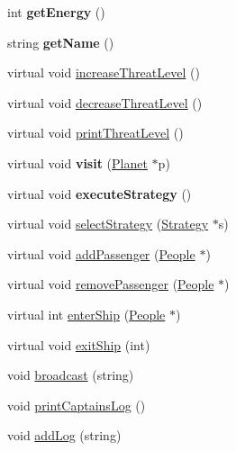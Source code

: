 \begin{DoxyCompactItemize}
\item 
\mbox{\label{classSpaceship_ad28625e31d78cc1edb5e248aaf3f01d8}} 
int {\bfseries get\+Energy} ()
\item 
\mbox{\label{classSpaceship_a89441170fc458252bf8fad377683c23d}} 
string {\bfseries get\+Name} ()
\item 
virtual void \hyperlink{classSpaceship_a5ddf702124286d9d3a6b5e64c09515bc}{increase\+Threat\+Level} ()
\item 
virtual void \hyperlink{classSpaceship_a73a1eefd211e9a2063d924ee85f0c0c7}{decrease\+Threat\+Level} ()
\item 
virtual void \hyperlink{classSpaceship_a8f16814f888a5a1423e5a491329cdb97}{print\+Threat\+Level} ()
\item 
\mbox{\label{classSpaceship_add79868aef85232b23c04af06f288447}} 
virtual void {\bfseries visit} (\hyperlink{classPlanet}{Planet} $\ast$p)
\item 
\mbox{\label{classSpaceship_a10e76fb093ab448894cdeb70994c821d}} 
virtual void {\bfseries execute\+Strategy} ()
\item 
virtual void \hyperlink{classSpaceship_a93be2d9d2b675ef978d866d4cd7a6524}{select\+Strategy} (\hyperlink{classStrategy}{Strategy} $\ast$s)
\item 
virtual void \hyperlink{classSpaceship_a67b7e60d2dc77e740309a9d994d653a1}{add\+Passenger} (\hyperlink{classPeople}{People} $\ast$)
\item 
virtual void \hyperlink{classSpaceship_ac816c2990b25a1b7c9f6acbc9ca132ee}{remove\+Passenger} (\hyperlink{classPeople}{People} $\ast$)
\item 
virtual int \hyperlink{classSpaceship_a3ed78b14953957576e42c6e741e04690}{enter\+Ship} (\hyperlink{classPeople}{People} $\ast$)
\item 
virtual void \hyperlink{classSpaceship_ae3ddb55d813fa2a3454c1745b23cf6ef}{exit\+Ship} (int)
\item 
void \hyperlink{classSpaceship_a6539b155cc0dc525c506eee788fe9449}{broadcast} (string)
\item 
void \hyperlink{classSpaceship_a949e9815b99d5598da2239e307036141}{print\+Captains\+Log} ()
\item 
void \hyperlink{classSpaceship_acf25a335848231435a64a484c103dfcb}{add\+Log} (string)
\item 

\end{DoxyCompactItemize}
